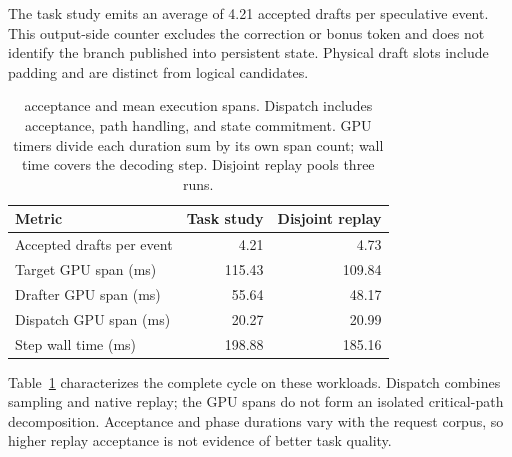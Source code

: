 The task study emits an average of 4.21 accepted drafts per \sys{} speculative event. This output-side counter excludes the correction or bonus token and does not identify the branch published into persistent state. Physical draft slots include padding and are distinct from logical candidates.

\begin{table}[t]
\caption{\sys{} acceptance and mean execution spans. Dispatch includes acceptance, path handling, and state commitment. GPU timers divide each duration sum by its own span count; wall time covers the decoding step. Disjoint replay pools three runs.}
\label{tab:recovered-telemetry}
\centering\small
\begin{tabular}{@{}lrr@{}}
\toprule
Metric & Task study & Disjoint replay \\
\midrule
Accepted drafts per event & 4.21 & 4.73 \\
Target GPU span (ms) & 115.43 & 109.84 \\
Drafter GPU span (ms) & 55.64 & 48.17 \\
Dispatch GPU span (ms) & 20.27 & 20.99 \\
Step wall time (ms) & 198.88 & 185.16 \\
\bottomrule
\end{tabular}
\end{table}

Table~\ref{tab:recovered-telemetry} characterizes the complete \sys{} cycle on these workloads. Dispatch combines sampling and native replay; the GPU spans do not form an isolated critical-path decomposition. Acceptance and phase durations vary with the request corpus, so higher replay acceptance is not evidence of better task quality.
